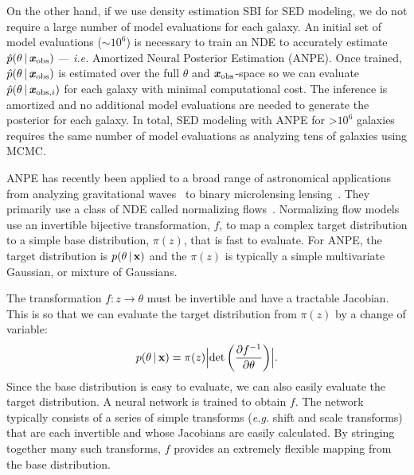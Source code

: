 On the other hand, if we use density estimation SBI for SED modeling, we do not
require a large number of model evaluations for each galaxy. 
An initial set of model evaluations (${\sim}10^6$) is necessary to train an NDE
to accurately estimate $\hat{p}(\theta \,|\, \textbf{\textit{x}}_{\rm obs})$ --- \emph{i.e.} Amortized
Neural Posterior Estimation (ANPE).
Once trained, $\hat{p}(\theta \,|\, \textbf{\textit{x}}_{\rm obs})$ is estimated over the full
$\theta$ and $\textbf{\textit{x}}_{\rm obs}$-space so we can evaluate 
$\hat{p}(\theta\,|\,\textbf{\textit{x}}_{{\rm obs}, i})$ for each galaxy with minimal
computational cost. 
The inference is amortized and no additional model evaluations are
needed to generate the posterior for each galaxy. 
In total, SED modeling with ANPE for >$10^6$ galaxies requires the same number
of model evaluations as analyzing tens of galaxies using MCMC. 

ANPE has recently been applied to a broad range of astronomical applications
from analyzing gravitational waves~\citep[\emph{e.g.}][]{wong2020,dax2021} to
binary microlensing lensing~\citep{zhang2021}.
They primarily use a class of NDE called normalizing flows~\citep{tabak2010,
tabak2013}.
Normalizing flow models use an invertible bijective transformation, $f$, to map
a complex target distribution to a simple base distribution, $\pi(z)$, that is
fast to evaluate.
For ANPE, the target distribution is $p(\theta \,|\, {\bf x})$ and the
$\pi(z)$ is typically a simple multivariate Gaussian, or mixture of Gaussians.

The transformation $f: z \rightarrow \theta$ must be invertible and have a
tractable Jacobian. 
This is so that we can evaluate the target distribution from $\pi(z)$ by a 
change of variable:  
\begin{equation} \label{eq:normflow}
    p(\theta \given {\bf x}) = \pi(z) \Bigl|{\rm det} \left(\frac{\partial
    f^{-1}}{\partial \theta} \right)\Bigr|.
\end{equation} 
Since the base distribution is easy to evaluate, we can also easily evaluate
the target distribution.  
A neural network is trained to obtain $f$.
The network typically consists of a series of simple transforms (\emph{e.g.}
shift and scale transforms) that are each invertible and whose Jacobians are
easily calculated. 
By stringing together many such transforms, $f$ provides an extremely flexible
mapping from the base distribution.

